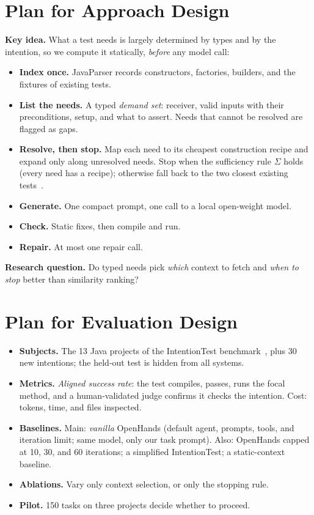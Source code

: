 \documentclass[sigconf,nonacm]{acmart}
\newcommand{\suff}{\ensuremath{\Sigma}\xspace}
\begin{document}
\section{Plan for Approach Design}
\textbf{Key idea.} What a test needs is largely determined by types and by the intention, so we compute it statically, \emph{before} any model call:
\begin{itemize}[leftmargin=2em,labelsep=0.5em]
  \item[\textbf{S0}] \textbf{Index once.} JavaParser records constructors, factories, builders, and the fixtures of existing tests.
  \item[\textbf{S1}] \textbf{List the needs.} A typed \emph{demand set}: receiver, valid inputs with their preconditions, setup, and what to assert. Needs that cannot be resolved are flagged as gaps.
  \item[\textbf{S2}] \textbf{Resolve, then stop.} Map each need to its cheapest construction recipe and expand only along unresolved needs. Stop when the sufficiency rule \suff holds (every need has a recipe); otherwise fall back to the two closest existing tests~\cite{zhou2026testtailor}.
  \item[\textbf{S3}] \textbf{Generate.} One compact prompt, one call to a local open-weight model.
  \item[\textbf{S4}] \textbf{Check.} Static fixes, then compile and run.
  \item[\textbf{S5}] \textbf{Repair.} At most one repair call.
\end{itemize}
\textbf{Research question.} Do typed needs pick \emph{which} context to fetch and \emph{when to stop} better than similarity ranking?

\section{Plan for Evaluation Design}
\begin{itemize}
  \item \textbf{Subjects.} The 13 Java projects of the IntentionTest benchmark~\cite{qi2025intentiontest}, plus 30 new intentions; the held-out test is hidden from all systems.
  \item \textbf{Metrics.} \emph{Aligned success rate}: the test compiles, passes, runs the focal method, and a human-validated judge confirms it checks the intention. Cost: tokens, time, and files inspected.
  \item \textbf{Baselines.} Main: \emph{vanilla} OpenHands (default agent, prompts, tools, and iteration limit; same model, only our task prompt). Also: OpenHands capped at 10, 30, and 60 iterations; a simplified IntentionTest; a static-context baseline.
  \item \textbf{Ablations.} Vary only context selection, or only the stopping rule.
  \item \textbf{Pilot.} 150 tasks on three projects decide whether to proceed.
\end{itemize}
\end{document}
